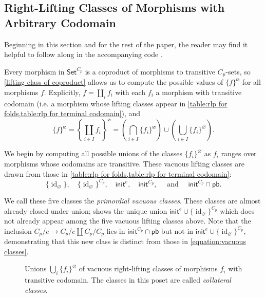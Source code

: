 \documentclass{amsart}
\renewcommand\emptyset\varnothing
\newcommand{\Set}{\mathsf{Set}}
\newcommand{\CpSet}{\Set^{C_p}}
\newcommand{\rlp}[1]{{#1}^{\boxslash}}
\newcommand{\init}{\mathsf{init}}
\newcommand{\pb}{\mathsf{pb}}
\DeclareMathOperator{\id}{id}
\numberwithin{equation}{section}
\theoremstyle{definition}
\begin{document}
\subsection{Right-Lifting Classes of Morphisms with Arbitrary Codomain}

Beginning in this section and for the rest of the paper, the reader may find it helpful to follow along in the accompanying code \cite{code}.

Every morphism in $\CpSet$ is a coproduct of morphisms to transitive $C_p$-sets, so \cref{lifting class of coproduct} allows us to compute the possible values of $\rlp{\{f\}}$ for all morphisms $f$. Explicitly, $f = \coprod_i f_i$ with each $f_i$ a morphism with transitive codomain (i.e. a morphism whose lifting classes appear in \cref{table:rlp for folds,table:rlp for terminal codomain}), and
\begin{equation}
	\label{equation:rlp of coproduct}
	\rlp{\{f\}} = \rlp{\left\{\coprod_{i \in I} f_i \right\}}
	= \left(\bigcap_{i \in I} \{f_i\}^\boxslash\right) \cup \left(\bigcup_{i \in I} \{f_i\}^\emptyset\right).
\end{equation}

We begin by computing all possible unions of the classes $\{f_i\}^\emptyset$ as $f_i$ ranges over morphisms whose codomains are transitive. These vacuous lifting classes are drawn from those in \cref{table:rlp for folds,table:rlp for terminal codomain}:
\begin{equation}
	\label{equation:vacuous classes}
	\{\id_\emptyset\},\quad
	\{\id_\emptyset\}^{C_p},\quad
	\init^e,\quad
	\init^{C_p},\quad\text{ and  }\quad
	\init^{C_p} \cap \pb.
\end{equation}

We call these five classes the \emph{primordial vacuous classes}. 
These classes are almost already closed under union;  shows the unique union $\init^e \cup \{\id_\emptyset\}^{C_p}$ which does not already appear among the five vacuous lifting classes above.
Note that the inclusion $C_p/e \to C_p/e \amalg C_p/C_p$ lies in $\init^{C_p} \cap \pb$ but not in $\init^e \cup \{\id_\emptyset\}^{C_p}$, demonstrating that this new class is distinct from those in \eqref{equation:vacuous classes}.

\begin{figure}[h]
	
	\caption{Unions $\bigcup_i \{f_i\}^\emptyset$ of vacuous right-lifting classes of morphisms $f_i$ with transitive codomain. The classes in this poset are called \textit{collateral classes}.} 
	\label{fig:Cp empty classes}
\end{figure}
\end{document}
